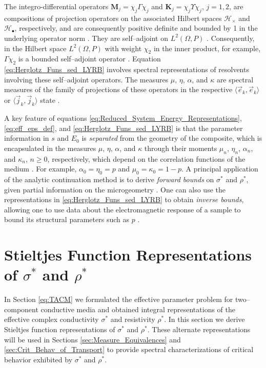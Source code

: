 \documentclass[english,12pt,jmp,graphicx]{revtex4-1}
\begin{document}
The integro-differential operators $\mathbf{M}_j=\chi_j\Gamma\chi_j$ and
$\mathbf{K}_j=\chi_j\Upsilon\chi_j$, $j=1,2$, are compositions of projection
operators on the associated Hilbert spaces $\mathscr{H}_\times$ and
$\mathscr{H}_\bullet$, respectively, and are consequently positive definite
and bounded by 1 in the underlying operator norm \cite{Rudin:87}. They
are self--adjoint 
on $L^2(\Omega,P)$ \cite{Golden:CMP-473}. Consequently, in the Hilbert
space $L^2(\Omega,P)$ with weight $\chi_2$ in the inner product, for example,
$\Gamma\chi_2$ is a bounded self--adjoint operator
\cite{Golden:CMP-473}. Equation \eqref{eq:Herglotz_Funs_sed_LYRB}
involves spectral representations of resolvents involving these
self--adjoint operators. The measures $\mu$, $\eta$, $\alpha$, and $\kappa$ are
spectral measures of the family of projections of these operators in
the respective $\langle\vec{e}_k,\vec{e}_k\rangle$ or $\langle\vec{j}_k,\vec{j}_k\rangle$ state
\cite{Golden:CMP-473,Reed-1980}.    

A key feature of equations
\eqref{eq:Reduced_System_Energy_Representations}, \eqref{eq:eff_eps_def}, and
\eqref{eq:Herglotz_Funs_sed_LYRB} is 
that the parameter information in $s$ and $E_0$ is {\it separated}
from the geometry of the composite, which is encapsulated in the 
measures $\mu$, $\eta$, $\alpha$, and $\kappa$ through their moments $\mu_n$, $\eta_n$,
$\alpha_n$, and $\kappa_n$, $n\geq0$, respectively, which depend on the correlation functions of the
medium \cite{Golden:CMP-473}. For example, $\alpha_0=\eta_0=p$ and
$\mu_0=\kappa_0=1-p$. A principal application of the analytic continuation
method is to derive \emph{forward bounds} on $\sigma^*$ and $\rho^*$, given partial
information on the microgeometry
\cite{Bergman:PRL-1285,Milton:APL-300,Golden:CMP-473,Bergman:AP-78}. One
can also use the
representations in
\eqref{eq:Herglotz_Funs_sed_LYRB} to obtain \emph{inverse bounds},
allowing one to use data about the electromagnetic response of a
sample to bound its structural parameters such as $p$ \cite{Golden:JoB:337}.
%
\section{Stieltjes Function Representations of $\sigma^*$ and $\rho^*$}
\label{sec:SF_Reps}
%
In Section \ref{eq:TACM} we formulated the effective parameter problem
for two--component conductive media and obtained integral
representations of the effective complex conductivity $\sigma^*$ and
resistivity $\rho^*$. In this section we derive Stieltjes function
representations of $\sigma^*$ and $\rho^*$. These alternate
representations will be used in Sections
\ref{sec:Measure_Equivalences} and \ref{sec:Crit_Behav_of_Transport}
to provide spectral characterizations of critical behavior
exhibited by $\sigma^*$ and $\rho^*$.   
\end{document}
